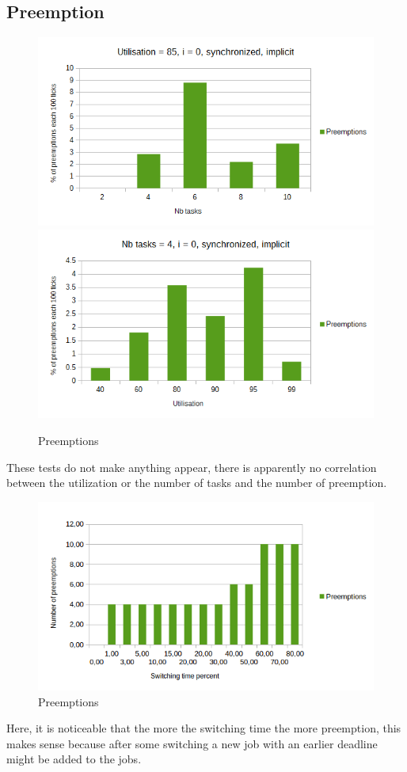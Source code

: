 \documentclass[a4paper,12pt]{article}
\begin{document}
\subsection{Preemption}
\begin{figure}[H]
	\begin{center}
		\includegraphics[scale=0.49]{nbtaskspreemption.png}
		\includegraphics[scale=0.49]{utilisationpreemption.png}
	\end{center}
	\label{p}
	\caption{Preemptions}
\end{figure}

These tests do not make anything appear, there is apparently no correlation between the utilization or the number of tasks and the number of preemption.

\begin{figure}[H]
	\begin{center}
		\includegraphics[scale=1]{switchingpreemption.png}
	\end{center}
	\label{p}
	\caption{Preemptions}
\end{figure}

Here, it is noticeable that the more the switching time the more preemption, this makes sense because after some switching a new job with an earlier deadline might be added to the jobs.
\end{document}
